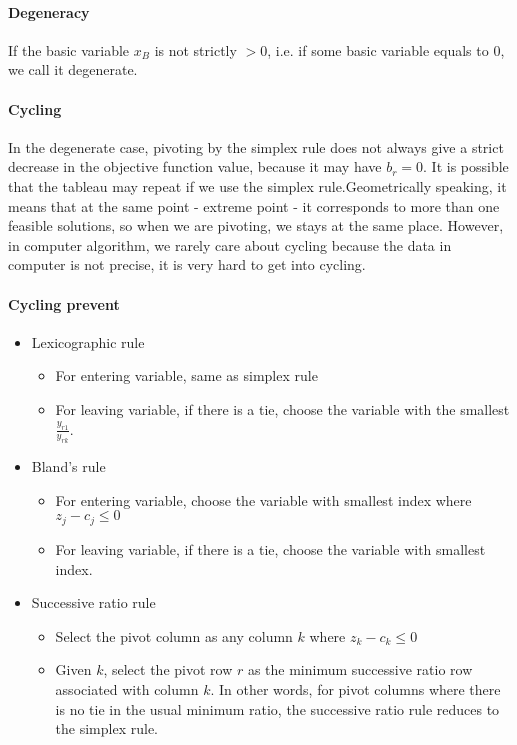             \paragraph{Degeneracy}
                If the basic variable $x_B$ is not strictly $> 0$, i.e. if some basic variable equals to 0, we call it degenerate.

            \paragraph{Cycling}
                In the degenerate case, pivoting by the simplex rule does not always give a strict decrease in the objective function value, because it may have $b_r = 0$. It is possible that the tableau may repeat if we use the simplex rule.Geometrically speaking, it means that at the same point - extreme point - it corresponds to more than one feasible solutions, so when we are pivoting, we stays at the same place. However, in computer algorithm, we rarely care about cycling because the data in computer is not precise, it is very hard to get into cycling.

            \paragraph{Cycling prevent}
                \begin{itemize}
                    \item Lexicographic rule
                    \begin{itemize}
                        \item For entering variable, same as simplex rule
                        \item For leaving variable, if there is a tie, choose the variable with the smallest $\frac{y_{r1}}{y_{rk}}$.
                    \end{itemize}
                    \item Bland's rule
                    \begin{itemize}
                        \item For entering variable, choose the variable with smallest index where $z_j - c_j \le 0$
                        \item For leaving variable, if there is a tie, choose the variable with smallest index.
                    \end{itemize}
                    \item Successive ratio rule
                    \begin{itemize}
                        \item Select the pivot column as any column $k$ where $z_k - c_k \le 0$
                        \item Given $k$, select the pivot row $r$ as the minimum successive ratio row associated with column $k$. In other words, for pivot columns where there is no tie in the usual minimum ratio, the successive ratio rule reduces to the simplex rule.
                    \end{itemize}
                \end{itemize}

